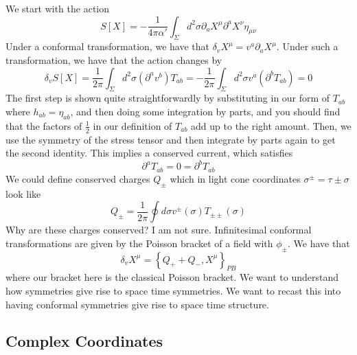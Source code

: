 \documentclass[11pt, oneside]{article}   	%
\theoremstyle{slanted}
\begin{document}
We start with the action 
\[
 S \left[  X  \right]   =  - \frac{1}{4 \pi \alpha ' } \int_{ \Sigma } 
 d ^ 2 \sigma \partial  _ a X ^ \mu \partial  ^ a X ^ \nu \eta _{ \mu \nu } 
\] Under a conformal transformation, we have that 
$ \delta _ v X ^ \mu  = v ^ a \partial  _ a X ^ \mu $. 
Under such a transformation, we have that the action 
changes by 
\[
 \delta _ v S \left[  X  \right]   = 
 \frac{1}{2 \pi } \int _{ \Sigma  } d ^ 2 \sigma \left( 
 \partial  ^ a v ^ b \right)  T _{ ab }  =  - \frac{1}{2 \pi } 
 \int _{ \Sigma } d ^ 2 \sigma v ^ a \left( \partial  ^ b 
 T _{ ab } \right)   = 0 
\] The first step is shown 
quite straightforwardly by 
substituting in our form of $ T _{ ab } $ 
where $ h _{ ab }  = \eta _{ ab } $, and 
then doing some integration by parts, 
and you should find that the factors of 
$\frac{1}{2 } $ in our definition of $ T _{ ab } $ add up 
to the right amount.
Then, we use the symmetry 
of the stress tensor and then integrate by parts 
again to get the second identity.
This implies a conserved current, which satisfies 
\[
 \partial  ^ a T _{ ab } = 0  = \partial  ^ b T _{ ab } 
\] We could define conserved 
charges $ Q _{  \pm  } $  which in 
light cone coordinates $ \sigma ^{ \pm }  = \tau \pm \sigma $ look like 
\[
 Q _{ \pm }  = \frac{1}{2 \pi } \oint d \sigma v ^{ \pm } 
 \left( \sigma  \right)  T _{ \pm \pm } \left( \sigma  \right) 
\] Why are these charges conserved? I 
am not sure. Infinitesimal conformal transformations 
are given by the Poisson bracket of a field with $ \phi_{\pm }  $. 
We have that 
\[
 \delta _ v X ^ \mu  = \left\{  Q _ + + Q _  - , X ^ \mu  \right\}  
 _{ PB}
\] where our bracket here is the classical 
Poisson bracket. 
We want to understand how symmetries 
give rise to space time symmetries. 
We want to recast this into having conformal symmetries 
give rise to space time structure. 

\subsection{Complex Coordinates}
\end{document}
